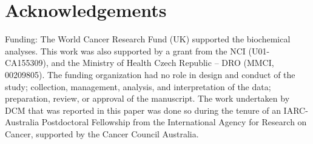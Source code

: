 \documentclass[a4paper,11pt]{article}
\begin{document}
\section*{Acknowledgements}
\noindent Funding:
The World Cancer Research Fund (UK) supported the biochemical analyses. This work was 
also supported by a grant from the NCI (U01-CA155309), and the Ministry of Health 
Czech Republic -- DRO (MMCI, 00209805). The funding organization had no role in 
design and conduct of the study; collection, management, analysis, and 
interpretation of the data; preparation, review, or approval of the manuscript. The 
work undertaken by DCM that was reported in this paper was done so during the tenure 
of an IARC-Australia Postdoctoral Fellowship from the International Agency for 
Research on Cancer, supported by the Cancer Council Australia. 

\clearpage


\end{document}
